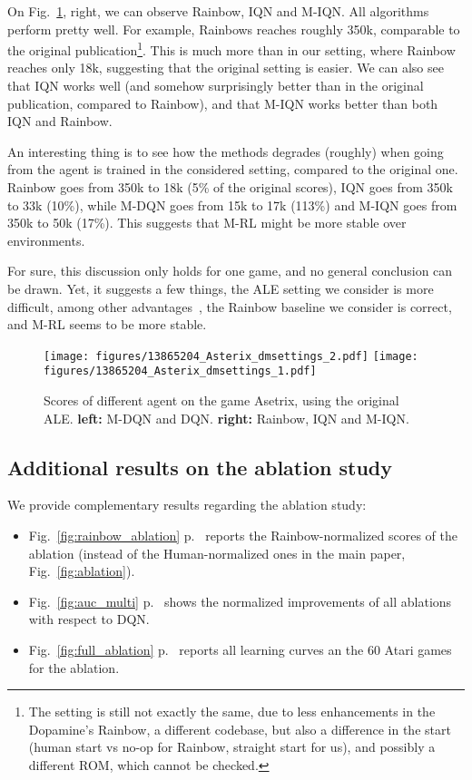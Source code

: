 \documentclass{article}
\begin{document}
On Fig.~\ref{fig:asterix_original}, right, we can observe Rainbow, IQN and M-IQN. All algorithms perform pretty well. For example, Rainbows reaches roughly 350k, comparable to the original publication\footnote{The setting is still not exactly the same, due to less enhancements in the Dopamine's Rainbow, a different codebase, but also a difference in the start (human start vs no-op for Rainbow, straight start for us), and possibly a different ROM, which cannot be checked.}. This is much more than in  our setting, where Rainbow reaches only 18k, suggesting that the original setting is easier. We can also see that IQN works well (and somehow surprisingly better than in the original publication, compared to Rainbow), and that M-IQN works better than both IQN and Rainbow.

An interesting thing is to see how the methods degrades (roughly) when going from the agent is trained in the considered setting, compared to the original one. Rainbow goes from 350k to 18k (5\% of the original scores), IQN goes from 350k to 33k (10\%), while M-DQN goes from 15k to 17k (113\%) and M-IQN goes from 350k to 50k (17\%). This suggests that M-RL might be more stable over environments.

For sure, this discussion only holds for one game, and no general conclusion can be drawn. Yet, it suggests a few things, the ALE setting we consider is more difficult, among other advantages~\cite{machado2018revisiting}, the Rainbow baseline we consider is correct, and M-RL seems to be more stable.


\begin{figure}
    \centering
    \texttt{[image: figures/13865204\_Asterix\_dmsettings\_2.pdf]}
    \texttt{[image: figures/13865204\_Asterix\_dmsettings\_1.pdf]}
    \caption{Scores of different agent on the game Asetrix, using the original ALE. \textbf{left:} M-DQN and DQN. \textbf{right:} Rainbow, IQN and M-IQN.}
    \label{fig:asterix_original}
\end{figure}

\subsection{Additional results on the ablation study}
\label{subappx:ablation}

We provide complementary results regarding the ablation study:
\begin{itemize}
    \item Fig.~\ref{fig:rainbow_ablation} p.~\pageref{fig:rainbow_ablation} reports the Rainbow-normalized scores of the ablation (instead of the Human-normalized ones in the main paper, Fig.~\ref{fig:ablation}).
    \item Fig.~\ref{fig:auc_multi} p.~\pageref{fig:auc_multi} shows the normalized improvements of all ablations with respect to DQN.
    \item Fig.~\ref{fig:full_ablation} p.~\pageref{fig:full_ablation} reports all learning curves an the 60 Atari games for the ablation.
\end{itemize}
\end{document}
